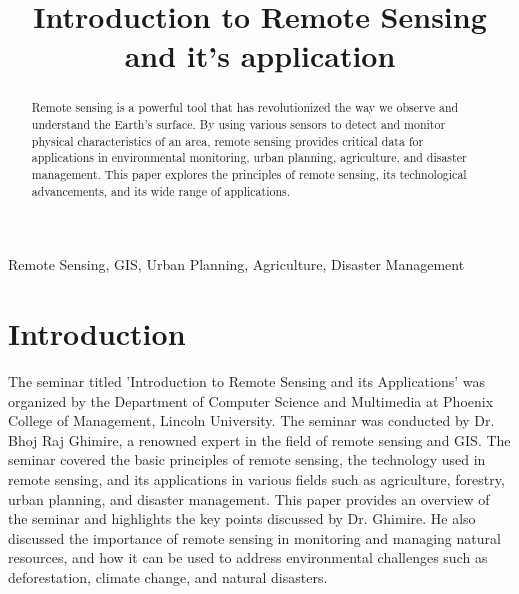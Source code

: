 \documentclass[conference]{IEEEtran}
\begin{document}
\title{Introduction to Remote Sensing and it's application}

\author{
}

\maketitle

\begin{abstract}
    Remote sensing is a powerful tool that has revolutionized the way we observe and understand the Earth's surface. By using various sensors to detect and monitor physical characteristics of an area, remote sensing provides critical data for applications in environmental monitoring, urban planning, agriculture, and disaster management. This paper explores the principles of remote sensing, its technological advancements, and its wide range of applications.
\end{abstract}

\begin{IEEEkeywords}
    Remote Sensing, GIS, Urban Planning, Agriculture, Disaster Management
\end{IEEEkeywords}

\section{Introduction}
The seminar titled 'Introduction to Remote Sensing and its Applications' was organized by the Department of Computer Science and Multimedia at Phoenix College of Management, Lincoln University. The seminar was conducted by Dr. Bhoj Raj Ghimire, a renowned expert in the field of remote sensing and GIS. The seminar covered the basic principles of remote sensing, the technology used in remote sensing, and its applications in various fields such as agriculture, forestry, urban planning, and disaster management. This paper provides an overview of the seminar and highlights the key points discussed by Dr. Ghimire. He also discussed the importance of remote sensing in monitoring and managing natural resources, and how it can be used to address environmental challenges such as deforestation, climate change, and natural disasters.
\end{document}
